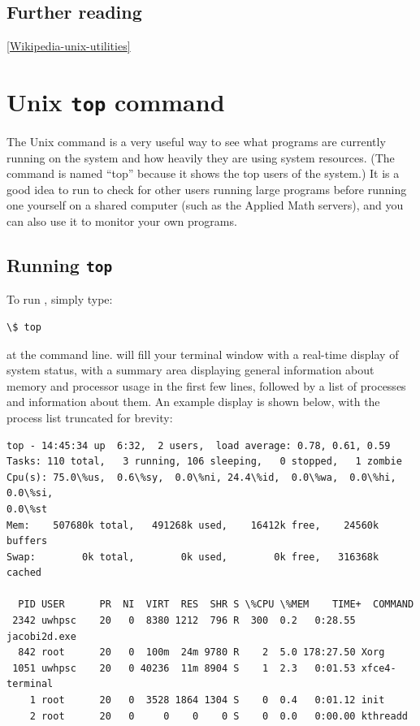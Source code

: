 \documentclass[letterpaper,10pt,english]{sphinxmanual}
\begin{document}
\subsection{Further reading}
\label{unix:further-reading}
{\hyperref[biblio:wikipedia-unix-utilities]{{[}Wikipedia-unix-utilities{]}}}


\section{Unix \texttt{top} command}
\label{top:unix-top-command}\label{top:topcommand}\label{top::doc}
The Unix  command is a very useful way to see what programs are
currently running on the system and how heavily they are using system
resources.  (The command is named ``top'' because it shows the top users
of the system.)  It is a good idea to run  to check for other
users running large programs before running one yourself on a shared
computer (such as the Applied Math servers), and you can also use it
to monitor your own programs.


\subsection{Running \texttt{top}}
\label{top:running-top}
To run , simply type:

\begin{Verbatim}[commandchars=\\\{\}]
\$ top
\end{Verbatim}

at the command line.   will fill your terminal window with a
real-time display of system status, with a summary area displaying
general information about memory and processor usage in the first few
lines, followed by a list of processes and information about them.  An
example display is shown below, with the process list truncated for
brevity:

\begin{Verbatim}[commandchars=\\\{\}]
top - 14:45:34 up  6:32,  2 users,  load average: 0.78, 0.61, 0.59
Tasks: 110 total,   3 running, 106 sleeping,   0 stopped,   1 zombie
Cpu(s): 75.0\%us,  0.6\%sy,  0.0\%ni, 24.4\%id,  0.0\%wa,  0.0\%hi,  0.0\%si,
0.0\%st
Mem:    507680k total,   491268k used,    16412k free,    24560k buffers
Swap:        0k total,        0k used,        0k free,   316368k cached

  PID USER      PR  NI  VIRT  RES  SHR S \%CPU \%MEM    TIME+  COMMAND
 2342 uwhpsc    20   0  8380 1212  796 R  300  0.2   0:28.55 jacobi2d.exe
  842 root      20   0  100m  24m 9780 R    2  5.0 178:27.50 Xorg
 1051 uwhpsc    20   0 40236  11m 8904 S    1  2.3   0:01.53 xfce4-terminal
    1 root      20   0  3528 1864 1304 S    0  0.4   0:01.12 init
    2 root      20   0     0    0    0 S    0  0.0   0:00.00 kthreadd
\end{Verbatim}
\end{document}
